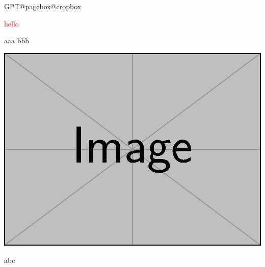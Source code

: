 



\expandafter\ifx\csname GPT@pagebox@cropbox\endcsname\relax\else
{}
\fi

\textcolor{red}{hello}


aaa  bbb

\includegraphics[scale=.5]{example-image}

\scrollmode 
\hbox{{\color[gray]{-8}}}

abc

\bye